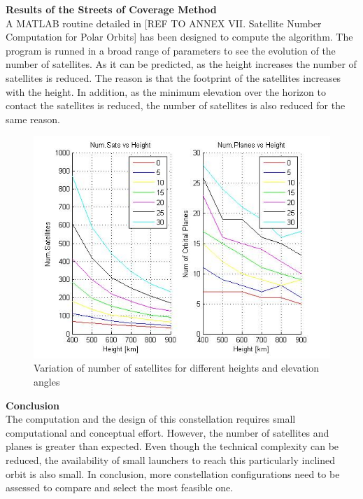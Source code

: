 \textbf{Results of the Streets of Coverage Method\\}
A MATLAB routine detailed in [{REF TO ANNEX VII. Satellite Number Computation for Polar Orbits}] has been designed to compute the  algorithm. The program is runned in a broad range of parameters to see the evolution of the number of satellites. As it can be predicted, as the height increases the number of satellites is reduced. The reason is that the footprint of the satellites increases with the height. In addition, as the minimum elevation over the horizon to contact the satellites is reduced, the number of satellites is also reduced for the same reason. 

\begin{figure}[H]
\begin{center}
\includegraphics[scale=0.6]{PolarOrbits/GeneralResults.jpg}
\caption{Variation of number of satellites for different heights and elevation angles}
\end{center}
\end{figure}

%

\textbf{Conclusion}\\
The computation and the design of this constellation requires small computational and conceptual effort. However, the number of satellites and planes is greater than expected. Even though the technical complexity can be reduced, the availability of small launchers to reach this particularly inclined orbit is also small. In conclusion, more constellation configurations need to be assessed to compare and select the most feasible one.

%
%